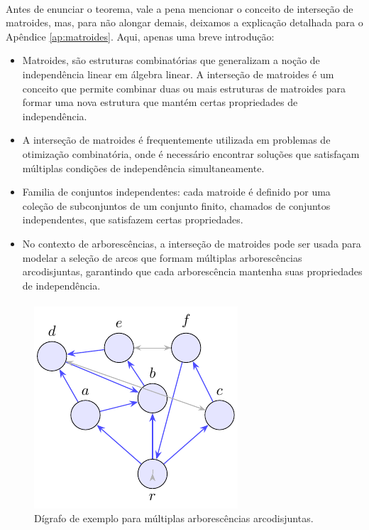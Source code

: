 \documentclass[12pt,a4paper]{article}
\def\emph#1{#1}%
\begin{document}
\paragraph{}
Antes de enunciar o teorema, vale a pena mencionar o conceito de \emph{interseção de matroides}, mas, para não alongar demais, deixamos a explicação detalhada para o Apêndice \ref{ap:matroides}. Aqui, apenas uma breve introdução:
\begin{itemize}
    \item Matroides, são estruturas combinatórias que generalizam a noção de independência linear em álgebra linear. A interseção de matroides é um conceito que permite combinar duas ou mais estruturas de matroides para formar uma nova estrutura que mantém certas propriedades de independência.
    \item A interseção de matroides é frequentemente utilizada em problemas de otimização combinatória, onde é necessário encontrar soluções que satisfaçam múltiplas condições de independência simultaneamente.
    \item Familia de conjuntos independentes: cada matroide é definido por uma coleção de subconjuntos de um conjunto finito, chamados de conjuntos independentes, que satisfazem certas propriedades.
    \item No contexto de arborescências, a interseção de matroides pode ser usada para modelar a seleção de arcos que formam múltiplas arborescências arcodisjuntas, garantindo que cada arborescência mantenha suas propriedades de independência.
\end{itemize}

\paragraph{}

\begin{figure}[H]
    \centering
    \includegraphics[width=0.9\linewidth]{figures/fig_exemplo_multiplas_arborescencias.pdf}

    \caption{Dígrafo de exemplo para múltiplas arborescências arcodisjuntas.}
    \label{fig:exemplo-multiplas-arborescencias}\end{figure}
\end{document}
